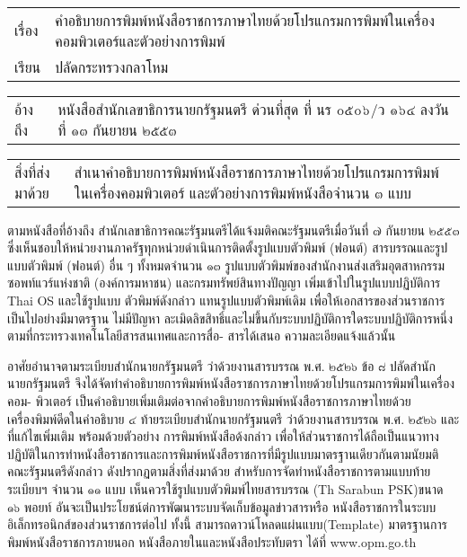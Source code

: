 \documentclass[a4paper, oneside]{article}
\begin{document}
	\ 
	\vskip 0.5cm
	\
	\newline
	\newline
	\makebox[11.0cm][l]{}
	
	\makebox[6.0cm][l]{}
	
	\hskip -2.7cm
	\begin{tabular}{p{0.6cm} p{15.4cm}}
		เรื่อง &
		คำอธิบายการพิมพ์หนังสือราชการภาษาไทยด้วยโปรแกรมการพิมพ์ในเครื่องคอมพิวเตอร์และตัวอย่างการพิมพ์ \\
		เรียน &
		ปลัดกระทรวงกลาโหม \\
	\end{tabular}
	
	\hskip -2.7cm
	\begin{tabular}{p{1.0cm} p{15.0cm}}
		อ้างถึง &
		หนังสือสำนักเลขาธิการนายกรัฐมนตรี ด่วนที่สุด ที่ นร ๐๕๐๖/ว ๑๖๔ ลงวันที่ ๑๓ กันยายน ๒๕๕๓ \\
	\end{tabular}
	
	\hskip -2.7cm
	\begin{tabular}{p{2.2cm} p{13.8cm}}
		สิ่งที่ส่งมาด้วย&สำเนาคำอธิบายการพิมพ์หนังสือราชการภาษาไทยด้วยโปรแกรมการพิมพ์ในเครื่องคอมพิวเตอร์ และตัวอย่างการพิมพ์หนังสือจำนวน ๓ แบบ
	\end{tabular}
	
	ตามหนังสือที่อ้างถึง สำนักเลขาธิการคณะรัฐมนตรีได้แจ้งมติคณะรัฐมนตรีเมื่อวันที่ ๗ กันยายน ๒๕๕๓
	ซึ่งเห็นชอบให้หน่วยงานภาครัฐทุกหน่วยดำเนินการติดตั้งรูปแบบตัวพิมพ์ (ฟอนต์) สารบรรณและรูปแบบตัวพิมพ์
	(ฟอนต์) อื่น ๆ ทั้งหมดจำนวน ๑๓ รูปแบบตัวพิมพ์ของสำนักงานส่งเสริมอุตสาหกรรมซอพท์แวร์แห่งชาติ
	(องค์การมหาชน) และกรมทรัพย์สินทางปัญญา เพิ่มเข้าไปในรูปแบบปฏิบัติการ Thai OS และใช้รูปแบบ
	ตัวพิมพ์ดังกล่าว แทนรูปแบบตัวพิมพ์เดิม เพื่อให้เอกสารของส่วนราชการเป็นไปอย่างมีมาตรฐาน ไม่มีปัญหา
	ละเมิดลิขสิทธิ์และไม่ขึ้นกับระบบปฏิบัติการใดระบบปฏิบัติการหนึ่ง ตามที่กระทรวงเทคโนโลยีสารสนเทศและการสื่อ- สารได้เสนอ ความละเอียดแจ้งแล้วนั้น
	
	อาศัยอำนาจตามระเบียบสำนักนายกรัฐมนตรี ว่าด้วยงานสารบรรณ พ.ศ. ๒๕๒๖ ข้อ ๘ ปลัดสำนักนายกรัฐมนตรี
	จึงได้จัดทำคำอธิบายการพิมพ์หนังสือราชการภาษาไทยด้วยโปรแกรมการพิมพ์ในเครื่องคอม- พิวเตอร์
	เป็นคำอธิบายเพิ่มเติมต่อจากคำอธิบายการพิมพ์หนังสือราชการภาษาไทยด้วยเครื่องพิมพ์ดีดในคำอธิบาย ๔
	ท้ายระเบียบสำนักนายกรัฐมนตรี ว่าด้วยงานสารบรรณ พ.ศ. ๒๕๒๖ และที่แก้ไขเพิ่มเติม พร้อมด้วยตัวอย่าง
	การพิมพ์หนังสือด้งกล่าว เพื่อให้ส่วนราชการได้ถือเป็นแนวทางปฏิบัติในการทำหนังสือราชการและการพิมพ์หนังสือราชการที่มีรูปแบบมาตรฐานเดียวกันตามนัยมติคณะรัฐมนตรีดังกล่าว
	ดังปรากฏตามสิ่งที่ส่งมาด้วย
	สำหรับการจัดทำหนังสือราชการตามแบบท้ายระเบียบฯ จำนวน ๑๑ แบบ เห็นควรใช้รูปแบบตัวพิมพ์ไทยสารบรรณ
	(Th Sarabun PSK)ขนาด ๑๖ พอยท์ อันจะเป็นประโยชน์ต่การพัฒนาระบบจัดเก็บข้อมูลข่าวสารหรือ
	หนังสือราชการในระบบอิเล็กทรอนิกส์ของส่วนราชการต่อไป ทั้งนี้ สามารถดาวน์โหลดแผ่นแบบ(Template)
	มาตรฐานการพิมพ์หนังสือราชการภายนอก หนังสือภายในและหนังสือประทับตรา ได้ที่ www.opm.go.th
	
\end{document}
